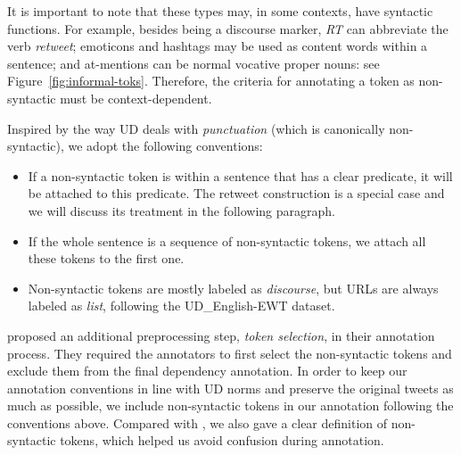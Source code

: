 \documentclass[11pt,a4paper]{article}
\begin{document}
It is important to note that these types may, in some
contexts, have syntactic functions.
For example, besides being a discourse marker, \emph{RT} can
abbreviate the verb {\it retweet}; emoticons and hashtags may be
used as content words within a sentence; and at-mentions can be normal vocative proper nouns: see Figure~\ref{fig:informal-toks}.  
Therefore, the criteria for annotating a
token as non-syntactic must be context-dependent.



Inspired by the way UD deals with \emph{punctuation} (which is
canonically non-syntactic), we adopt the following
conventions:


\begin{itemize}
\item If a non-syntactic token is within a sentence that has a clear predicate, it will be attached to this predicate. 
The retweet construction is a special case and we will discuss its treatment in the following paragraph.
\item If the whole sentence is a sequence of non-syntactic tokens, we attach all these tokens to the first one.
\item Non-syntactic tokens are mostly labeled as {\it discourse}, but
  URLs are always labeled as {\it list}, following the UD\_English-EWT dataset.\end{itemize}













 proposed an additional
preprocessing step, \emph{token selection}, in their annotation process.
They required the annotators to first select the non-syntactic
tokens and exclude them from the final dependency annotation.
In order to keep our annotation conventions in line with UD norms and preserve the original tweets as much as possible,
we include non-syntactic tokens in our annotation following the
conventions above. Compared with \citet{kong-EtAl:2014:EMNLP2014},
we also gave a clear definition of non-syntactic tokens, which helped
us avoid confusion during annotation.
\end{document}
